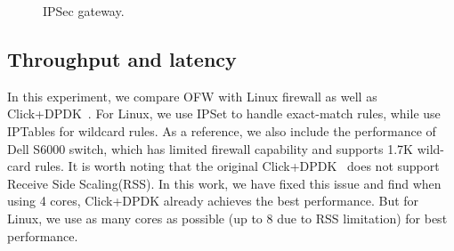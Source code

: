 \begin{figure}[t!]
\begin{minipage}{.3\textwidth}
		\centering
		\vspace{-10pt}
		\caption{IPSec gateway. }
		\vspace{-10pt}
		\label{fig:IPSec}
	\end{minipage}
\end{figure}

\subsection{Throughput and latency}


In this experiment, we compare OFW with Linux firewall as well as Click+DPDK~\cite{barbette2015fast}.
For Linux, we use IPSet to handle exact-match rules, while use IPTables for wildcard rules.
As a reference, we also include the performance of Dell S6000 switch, which has limited firewall capability 
and supports 1.7K wild-card rules.
It is worth noting that the original Click+DPDK~\cite{barbette2015fast} does not support Receive Side Scaling(RSS).
In this work, we have fixed this issue and find when using 4 cores, Click+DPDK already achieves the best performance. 
But for Linux, we use as many cores as possible (up to 8 due to RSS limitation) for best performance. 

